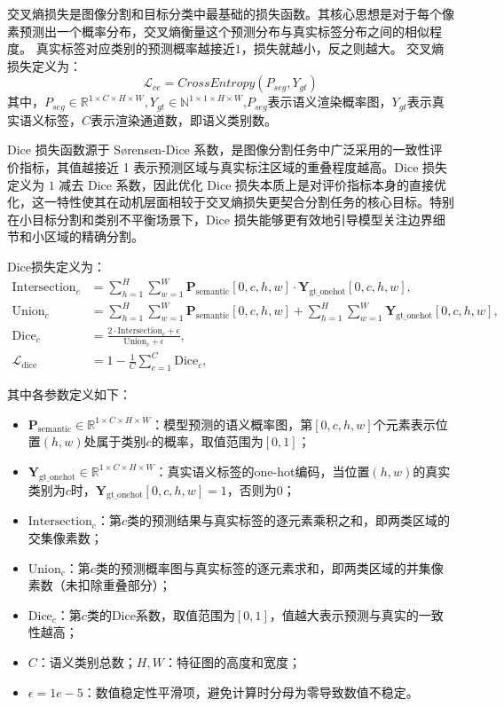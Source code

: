 交叉熵损失是图像分割和目标分类中最基础的损失函数。其核心思想是对于每个像素预测出一个概率分布，交叉熵衡量这个预测分布与真实标签分布之间的相似程度。
真实标签对应类别的预测概率越接近$1$，损失就越小，反之则越大。
交叉熵损失定义为：
\begin{equation}
    \mathcal{L} _{ce}=CrossEntropy(P_{seg},Y_{gt})
\end{equation}
其中，$P_{seg} \in \mathbb{R} ^{1\times C \times H \times W},Y_{gt}\in\mathbb{N} ^{1\times 1\times H\times W}$,$P_{seg}$表示语义渲染概率图，$Y_{gt}$表示真实语义标签，$C$表示渲染通道数，即语义类别数。

Dice 损失函数源于 Sørensen-Dice 系数，是图像分割任务中广泛采用的一致性评价指标，其值越接近 1 表示预测区域与真实标注区域的重叠程度越高。Dice 损失定义为 $1$ 减去 Dice 系数，因此优化 Dice 损失本质上是对评价指标本身的直接优化，这一特性使其在动机层面相较于交叉熵损失更契合分割任务的核心目标。特别在小目标分割和类别不平衡场景下，Dice 损失能够更有效地引导模型关注边界细节和小区域的精确分割。

Dice损失定义为：
\begin{equation}
\begin{aligned}
\text{Intersection}_c &= \sum_{h=1}^H\sum_{w=1}^W \mathbf{P}_{\text{semantic}}[0,c,h,w] \cdot \mathbf{Y}_{\text{gt\_onehot}}[0,c,h,w], \\
\text{Union}_c &= \sum_{h=1}^H\sum_{w=1}^W \mathbf{P}_{\text{semantic}}[0,c,h,w] + \sum_{h=1}^H\sum_{w=1}^W \mathbf{Y}_{\text{gt\_onehot}}[0,c,h,w], \\
\text{Dice}_c &= \frac{2 \cdot \text{Intersection}_c + \epsilon}{\text{Union}_c + \epsilon}, \\
\mathcal{L}_{\text{dice}} &= 1 - \frac{1}{C} \sum_{c=1}^C \text{Dice}_c,
\end{aligned}
\end{equation}

其中各参数定义如下：
\begin{itemize}
    \item $\mathbf{P}_{\text{semantic}} \in \mathbb{R}^{1 \times C \times H \times W}$：模型预测的语义概率图，第$[0,c,h,w]$个元素表示位置$(h,w)$处属于类别$c$的概率，取值范围为$[0,1]$；
    \item $\mathbf{Y}_{\text{gt\_onehot}} \in \mathbb{R}^{1 \times C \times H \times W}$：真实语义标签的one-hot编码，当位置$(h,w)$的真实类别为$c$时，$\mathbf{Y}_{\text{gt\_onehot}}[0,c,h,w] = 1$，否则为0；
    \item $\text{Intersection}_c$：第$c$类的预测结果与真实标签的逐元素乘积之和，即两类区域的交集像素数；
    \item $\text{Union}_c$：第$c$类的预测概率图与真实标签的逐元素求和，即两类区域的并集像素数（未扣除重叠部分）；
    \item $\text{Dice}_c$：第$c$类的Dice系数，取值范围为$[0,1]$，值越大表示预测与真实的一致性越高；
    \item $C$：语义类别总数；$H, W$：特征图的高度和宽度；
    \item $\epsilon = 1e-5$：数值稳定性平滑项，避免计算时分母为零导致数值不稳定。
\end{itemize}


